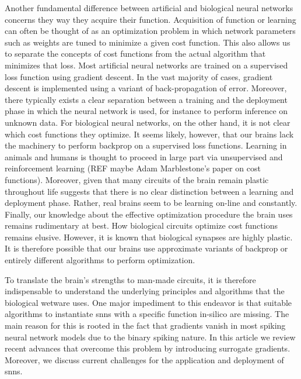 Another fundamental difference between artificial and biological neural networks concerns they way they acquire their function. 
Acquisition of function or learning can often be thought of as an optimization problem in which network parameters such as weights are tuned to minimize a given cost function.
This also allows us to separate the concepts of cost functions from the actual algorithm that minimizes that loss.
Most artificial neural networks are trained on a supervised loss function using gradient descent. In the vast majority of cases, gradient descent is implemented using a variant of back-propagation of error.
Moreover, there typically exists a clear separation between a training and the deployment phase in which the neural network is used, for instance to perform inference on unknown data. 
For biological neural networks, on the other hand, it is not clear which cost functions they optimize. 
It seems likely, however, that our brains lack the machinery to perform backprop on a supervised loss functions. Learning in animals and humans is thought to proceed in large part via unsupervised and reinforcement learning (REF maybe Adam Marblestone's paper on cost functions).
Moreover, given that many circuits of the brain remain plastic throughout life suggests that there is no clear distinction between a learning and deployment phase. Rather, real brains seem to be learning on-line and constantly. 
Finally, our knowledge about the effective optimization procedure the brain uses remains rudimentary at best.
How biological circuits optimize cost functions remains elusive. However, it is known that biological synapses are highly plastic. It is therefore possible that our brains use approximate variants of backprop or entirely different algorithms to perform optimization.

To translate the brain's strengths to man-made circuits, it is therefore indispensable to understand the underlying principles and algorithms that the biological wetware uses.
One major impediment to this endeavor is that suitable algorithms to instantiate \glspl{snn} with a specific function in-silico are missing. 
The main reason for this is rooted in the fact that gradients vanish in most spiking neural network models due to the binary spiking nature. 
In this article we review recent advances that overcome this problem by introducing surrogate gradients.
Moreover, we discuss current challenges for the application and deployment of \glspl{snn}.